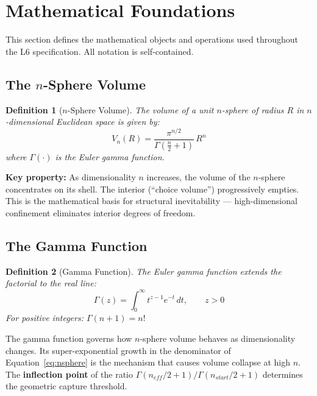 \documentclass[11pt, a4paper]{article}
\newtheorem{definition}{Definition}[section]
\begin{document}
\section{Mathematical Foundations}

This section defines the mathematical objects and operations used throughout
the L6 specification. All notation is self-contained.

\subsection{The $n$-Sphere Volume}

\begin{definition}[$n$-Sphere Volume]
The volume of a unit $n$-sphere of radius $R$ in $n$-dimensional Euclidean space
is given by:
\begin{equation}
  V_n(R) = \frac{\pi^{n/2}}{\Gamma\!\left(\frac{n}{2} + 1\right)} \, R^n
  \label{eq:nsphere}
\end{equation}
where $\Gamma(\cdot)$ is the Euler gamma function.
\end{definition}

\textbf{Key property:} As dimensionality $n$ increases, the volume of the
$n$-sphere concentrates on its shell. The interior (``choice volume'')
progressively empties. This is the mathematical basis for structural
inevitability --- high-dimensional confinement eliminates interior degrees
of freedom.

\subsection{The Gamma Function}

\begin{definition}[Gamma Function]
The Euler gamma function extends the factorial to the real line:
\begin{equation}
  \Gamma(z) = \int_0^{\infty} t^{z-1} e^{-t}\, dt, \qquad z > 0
\end{equation}
For positive integers: $\Gamma(n+1) = n!$
\end{definition}

The gamma function governs how $n$-sphere volume behaves as dimensionality
changes. Its super-exponential growth in the denominator of
Equation~\ref{eq:nsphere} is the mechanism that causes volume collapse at
high $n$. The \textbf{inflection point} of the ratio
$\Gamma(n_{eff}/2 + 1) / \Gamma(n_{start}/2 + 1)$ determines the
geometric capture threshold.
\end{document}
